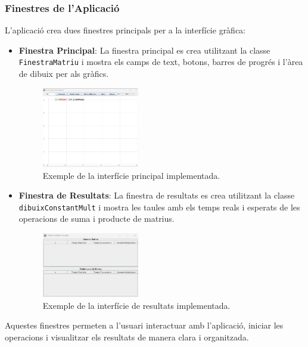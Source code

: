 \documentclass{ieeetj}
\begin{document}
\subsubsection{Finestres de l'Aplicació}
L'aplicació crea dues finestres principals per a la interfície gràfica:

\begin{itemize}
    \item \textbf{Finestra Principal}: La finestra principal es crea utilitzant la classe \texttt{FinestraMatriu} i mostra els camps de text, botons, barres de progrés i l'àrea de dibuix per als gràfics.

\begin{figure}[htbp]
\centerline{\includegraphics[width=0.4\textwidth]{Cap1Matrius/docs/png/grafica.png}}
\caption{Exemple de la interfície principal implementada.}
\label{fig:int1}
\end{figure}

    \item \textbf{Finestra de Resultats}: La finestra de resultats es crea utilitzant la classe \texttt{dibuixConstantMult} i mostra les taules amb els temps reals i esperats de les operacions de suma i producte de matrius.

\begin{figure}[htbp]
\centerline{\includegraphics[width=0.4\textwidth]{Cap1Matrius/docs/png/taulaResultats.png}}
\caption{Exemple de la interfície de resultats implementada.}
\label{fig:int2}
\end{figure}

\end{itemize}

Aquestes finestres permeten a l'usuari interactuar amb l'aplicació, iniciar les operacions i visualitzar els resultats de manera clara i organitzada.
\end{document}
